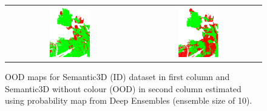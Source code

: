 \begin{figure}[h!]
\begin{tabular}{cc}
            \includegraphics[width=0.33\textwidth, height=0.18\textheight]{images/ood_imgs/sem3d_of/prob/de_sem3d_OOD_3.pdf}&
            \includegraphics[width=0.33\textwidth, height=0.18\textheight]{images/ood_imgs/sem3d_of/prob/de_sem3d_of_OOD_3.pdf}\\
        \end{tabular}
        \caption{OOD maps for Semantic3D (ID) dataset in first column and Semantic3D without colour (OOD) in second column estimated using probability map from Deep Ensembles (ensemble size of 10).}
        \label{fig:de_oodmap_sem3d_OF_prob}
    \end{figure}

